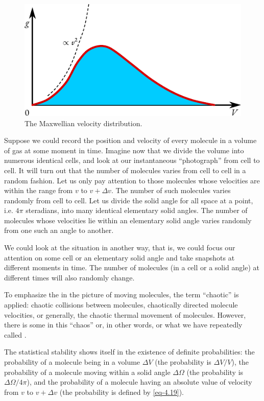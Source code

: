\begin{figure}[!ht]
\centering
\includegraphics[width=0.8\tfwidth]{figures/dist2.pdf}
\caption{The Maxwellian velocity distribution.\label{mxwl-space}}
\end{figure}

 Suppose we could record the position and velocity of every molecule in a volume of gas at some moment in time. Imagine now that we divide the volume into numerous identical cells, and look at our instantaneous ``photograph'' from cell to cell. It will turn out that the number of molecules varies from cell to cell in a random fashion. Let us only pay attention to those molecules whose velocities are within the range from $v$ to $v + \Delta v$. The number of such molecules varies randomly from cell to cell. Let us divide the solid angle for all space at a point, i.e. $4 \pi$ steradians, into many identical elementary solid angles. The number of molecules whose velocities lie within an elementary solid angle varies randomly from one such an angle to another.

We could look at the situation in another way, that is, we could focus our attention on some cell or an elementary solid angle and take snapshots at different moments in time. The number of molecules (in a cell or a solid angle) at different times will also randomly change.

To emphasize the  in the picture of moving molecules, the term ``chaotic'' is applied: chaotic collisions between molecules, chaotically directed molecule velocities, or generally, the chaotic thermal
movement of molecules. However, there is some  in this ``chaos'' or, in other words,  or what we have repeatedly called .

The statistical stability shows itself in the existence of definite probabilities: the probability of a molecule being in a volume $\Delta V$ (the probability is $\Delta V/ V$), the probability of a molecule moving within a solid angle $\Delta \Omega$ (the probability is $\Delta \Omega/4\pi$), and the probability of a molecule having an absolute value of velocity from $v$ to $v + \Delta v$ (the probability is defined by \eqref{eq-4.19}).

